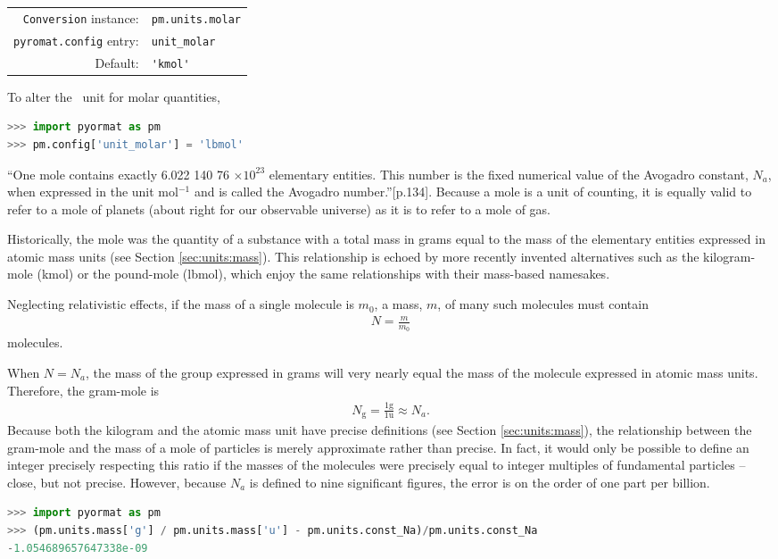 \begin{tabular}{rl}
\hline
\verb|Conversion| instance: & \verb|pm.units.molar|\\
\verb|pyromat.config| entry: & \verb|unit_molar|\\
Default: & \verb|'kmol'|\\
\hline
\end{tabular}
\vspace{1em}

To alter the \PM\ unit for molar quantities,
\begin{lstlisting}[language=Python]
>>> import pyormat as pm
>>> pm.config['unit_molar'] = 'lbmol'
\end{lstlisting}

``One mole contains exactly 6.022 140 76 $\times 10^{23}$ elementary entities. This number is the fixed numerical value of the Avogadro constant, $N_a$, when expressed in the unit mol$^{-1}$ and is called the Avogadro number.''\cite{si:2019}[p.134].  Because a mole is a unit of counting, it is equally valid to refer to a mole of planets (about right for our observable universe) as it is to refer to a mole of gas.

Historically, the mole was the quantity of a substance with a total mass in grams equal to the mass of the elementary entities expressed in atomic mass units (see Section \ref{sec:units:mass}).  This relationship is echoed by more recently invented alternatives such as the kilogram-mole (kmol) or the pound-mole (lbmol), which enjoy the same relationships with their mass-based namesakes.  

Neglecting relativistic effects, if the mass of a single molecule is $m_0$, a mass, $m$, of many such molecules must contain
\begin{align}
N = \frac{m}{m_0}
\end{align}
molecules.

When $N = N_a$, the mass of the group expressed in grams will very nearly equal the mass of the molecule expressed in atomic mass units.  Therefore, the gram-mole is
\begin{align}
N_\mathrm{g} = \frac{1\mathrm{g}}{1\mathrm{u}} \approx N_a.
\end{align}
Because both the kilogram and the atomic mass unit have precise definitions (see Section \ref{sec:units:mass}), the relationship between the gram-mole and the mass of a mole of particles is merely approximate rather than precise.  In fact, it would only be possible to define an integer precisely respecting this ratio if the masses of the molecules were precisely equal to integer multiples of fundamental particles -- close, but not precise.  However, because $N_a$ is defined to nine significant figures, the error is on the order of one part per billion.
\begin{lstlisting}[language=Python]
>>> import pyormat as pm
>>> (pm.units.mass['g'] / pm.units.mass['u'] - pm.units.const_Na)/pm.units.const_Na
-1.054689657647338e-09
\end{lstlisting}

